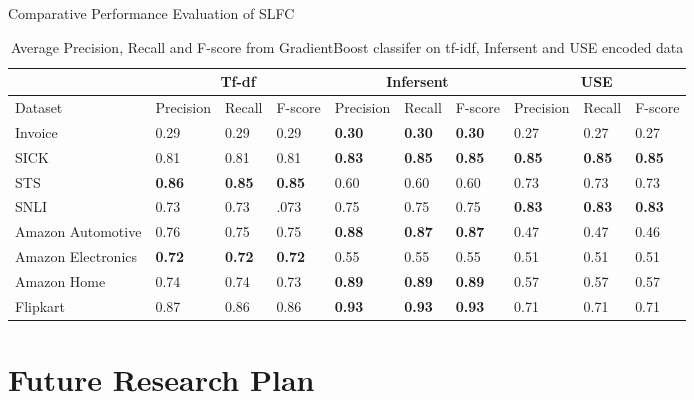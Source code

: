 \documentclass[blue]{beamer}
\begin{document}
\begin{frame}[shrink=10]{Comparative Performance Evaluation of SLFC}
\begin{table}[]
\centering
\caption{Average Precision, Recall and F-score from GradientBoost classifer on tf-idf, Infersent and USE encoded data}
\label{class:ngram}
\begin{tabular}{|l|l|l|l|l|l|l|l|l|l|}
\hline
                   & \multicolumn{3}{c|}{Tf-df}   & \multicolumn{3}{c|}{Infersent} & \multicolumn{3}{c|}{USE}     \\ \hline
Dataset            & Precision & Recall & F-score & Precision  & Recall  & F-score & Precision & Recall & F-score \\ \hline
Invoice            & 0.29      & 0.29   & 0.29    &{\bf 0.30}       & {\bf 0.30}    & {\bf 0.30}    & 0.27      & 0.27   & 0.27    \\ \hline
SICK               & 0.81      & 0.81   & 0.81    & {\bf 0.83}       & {\bf 0.85}    & {\bf 0.85}    & {\bf 0.85}      & {\bf 0.85}   & {\bf 0.85}    \\ \hline
STS                &{\bf 0.86}      & {\bf 0.85}   & {\bf 0.85}    & 0.60       & 0.60    & 0.60    & 0.73      & 0.73   & 0.73    \\ \hline
SNLI               & 0.73      & 0.73   & .073    & 0.75       & 0.75    & 0.75    & {\bf 0.83}      & {\bf 0.83}   & {\bf 0.83}    \\ \hline
Amazon Automotive  & 0.76      & 0.75   & 0.75    & {\bf 0.88}       & {\bf 0.87}    & {\bf 0.87}    & 0.47      & 0.47   & 0.46    \\ \hline
Amazon Electronics & {\bf 0.72}      & {\bf 0.72}   &{\bf  0.72}    & 0.55       & 0.55    & 0.55    & 0.51      & 0.51   & 0.51    \\ \hline
Amazon Home        & 0.74      & 0.74   & 0.73    & {\bf 0.89}       & {\bf 0.89}    &{\bf  0.89}    & 0.57      & 0.57   & 0.57    \\ \hline
Flipkart           & 0.87      & 0.86   & 0.86    & {\bf 0.93}       & {\bf 0.93}    & {\bf 0.93}    & 0.71      & 0.71   & 0.71    \\ \hline
\end{tabular}
\end{table}
\end{frame}



\section{Future Research Plan}
\end{document}
